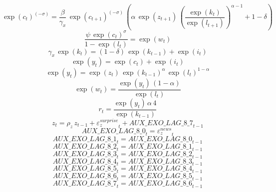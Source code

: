 \begin{dmath}
\exp\left({c}_{t}\right)^{\left(-{\sigma}\right)}=\frac{{\beta}}{{\gamma_x}}\, \exp\left({c}_{t+1}\right)^{\left(-{\sigma}\right)}\, \left({\alpha}\, \exp\left({z}_{t+1}\right)\, \left(\frac{\exp\left({k}_{t}\right)}{\exp\left({l}_{t+1}\right)}\right)^{{\alpha}-1}+1-{\delta}\right)
\end{dmath}
\begin{dmath}
\frac{{\psi}\, \exp\left({c}_{t}\right)^{{\sigma}}}{1-\exp\left({l}_{t}\right)}=\exp\left({w}_{t}\right)
\end{dmath}
\begin{dmath}
{\gamma_x}\, \exp\left({k}_{t}\right)=\left(1-{\delta}\right)\, \exp\left({k}_{t-1}\right)+\exp\left({{i}}_{t}\right)
\end{dmath}
\begin{dmath}
\exp\left({y}_{t}\right)=\exp\left({c}_{t}\right)+\exp\left({{i}}_{t}\right)
\end{dmath}
\begin{dmath}
\exp\left({y}_{t}\right)=\exp\left({z}_{t}\right)\, \exp\left({k}_{t-1}\right)^{{\alpha}}\, \exp\left({l}_{t}\right)^{1-{\alpha}}
\end{dmath}
\begin{dmath}
\exp\left({w}_{t}\right)=\frac{\exp\left({y}_{t}\right)\, \left(1-{\alpha}\right)}{\exp\left({l}_{t}\right)}
\end{dmath}
\begin{dmath}
{r}_{t}=\frac{\exp\left({y}_{t}\right)\, {\alpha}\, 4}{\exp\left({k}_{t-1}\right)}
\end{dmath}
\begin{dmath}
{z}_{t}={\rho_z}\, {z}_{t-1}+{{\varepsilon_z^{surprise}}}_{t}+{AUX\_EXO\_LAG\_8\_7}_{t-1}
\end{dmath}
\begin{dmath}
{AUX\_EXO\_LAG\_8\_0}_{t}={{\varepsilon_z^{news}}}_{t}
\end{dmath}
\begin{dmath}
{AUX\_EXO\_LAG\_8\_1}_{t}={AUX\_EXO\_LAG\_8\_0}_{t-1}
\end{dmath}
\begin{dmath}
{AUX\_EXO\_LAG\_8\_2}_{t}={AUX\_EXO\_LAG\_8\_1}_{t-1}
\end{dmath}
\begin{dmath}
{AUX\_EXO\_LAG\_8\_3}_{t}={AUX\_EXO\_LAG\_8\_2}_{t-1}
\end{dmath}
\begin{dmath}
{AUX\_EXO\_LAG\_8\_4}_{t}={AUX\_EXO\_LAG\_8\_3}_{t-1}
\end{dmath}
\begin{dmath}
{AUX\_EXO\_LAG\_8\_5}_{t}={AUX\_EXO\_LAG\_8\_4}_{t-1}
\end{dmath}
\begin{dmath}
{AUX\_EXO\_LAG\_8\_6}_{t}={AUX\_EXO\_LAG\_8\_5}_{t-1}
\end{dmath}
\begin{dmath}
{AUX\_EXO\_LAG\_8\_7}_{t}={AUX\_EXO\_LAG\_8\_6}_{t-1}
\end{dmath}

